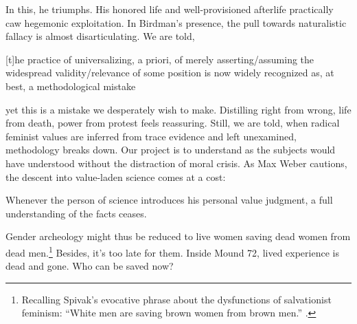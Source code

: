 In this, he triumphs. His honored life and well-provisioned afterlife practically caw hegemonic exploitation. In Birdman's presence, the pull towards naturalistic fallacy is almost disarticulating. We are told, \begin{IJSRAquote}{\cite[25]{lawson1999}}[t]he practice of universalizing, a priori, of merely asserting/assuming the widespread validity/relevance of some position is now widely recognized as, at best, a methodological mistake\end{IJSRAquote}yet this is a mistake we desperately wish to make. Distilling right from wrong, life from death, power from protest feels reassuring. Still, we are told, when radical feminist values are inferred from trace evidence and left unexamined, methodology breaks down. Our project is to understand as the subjects would have understood without the distraction of moral crisis. As Max Weber cautions, the descent into value-laden science comes at a cost: 
\begin{IJSRAquote}{\cite[146]{weber1946}}
	Whenever the person of science introduces his personal value judgment, a full understanding of the facts ceases.
\end{IJSRAquote}
	Gender archeology might thus be reduced to live women saving dead women from dead men.\footnote{Recalling Spivak's evocative phrase about the dysfunctions of salvationist feminism: 
	\enquote{White men are saving brown women from brown men.} \parencite[48]{spivak2010}.} 
Besides, it's too late for them. Inside Mound 72, lived experience is dead and gone. Who can be saved now?

